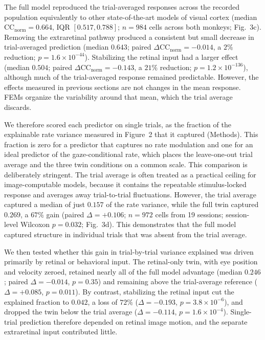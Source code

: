 \documentclass{lite}
\begin{document}
The full model reproduced the trial-averaged responses across the recorded population equivalently to other state-of-the-art models of visual cortex \cite{wang2025foundation} (median $\mathrm{CC_{norm}} = 0.664$, IQR $[0.517, 0.788]$; $n = 984$ cells across both monkeys; Fig.~3c). Removing the extraretinal pathway produced a consistent but small decrease in trial-averaged prediction (median $0.643$; paired $\Delta \mathrm{CC_{norm}} = -0.014$, a $2\%$ reduction; $p = 1.6\times10^{-44}$). Stabilizing the retinal input had a larger effect (median $0.504$; paired $\Delta \mathrm{CC_{norm}} = -0.143$, a $21\%$ reduction; $p = 1.2\times10^{-136}$), although much of the trial-averaged response remained predictable. However, the effects measured in previous sections are not changes in the mean response. FEMs organize the variability around that mean, which the trial average discards.

We therefore scored each predictor on single trials, as the fraction of the explainable rate variance measured in Figure~2 that it captured (Methods). This fraction is zero for a predictor that captures no rate modulation and one for an ideal predictor of the gaze-conditional rate, which places the leave-one-out trial average and the three twin conditions on a common scale. This comparison is deliberately stringent. The trial average is often treated as a practical ceiling for image-computable models, because it contains the repeatable stimulus-locked response and averages away trial-to-trial fluctuations. However, the trial average captured a median of just $0.157$ of the rate variance, while the full twin captured $0.269$, a $67\%$ gain (paired $\Delta = +0.106$; $n = 972$ cells from 19 sessions; session-level Wilcoxon $p = 0.032$; Fig.~3d). This demonstrates that the full model captured structure in individual trials that was absent from the trial average. 

We then tested whether this gain in trial-by-trial variance explained was driven primarily by retinal or behavioral input. The retinal-only twin, with eye position and velocity zeroed, retained nearly all of the full model advantage (median $0.246$; paired $\Delta = -0.014$, $p = 0.35$) and remaining above the trial-average reference ($\Delta = +0.085$, $p = 0.011$). By contrast, stabilizing the retinal input cut the explained fraction to $0.042$, a loss of $72\%$ ($\Delta = -0.193$, $p = 3.8\times10^{-6}$), and dropped the twin below the trial average ($\Delta = -0.114$, $p = 1.6\times10^{-4}$). Single-trial prediction therefore depended on retinal image motion, and the separate extraretinal input contributed little.
\end{document}
